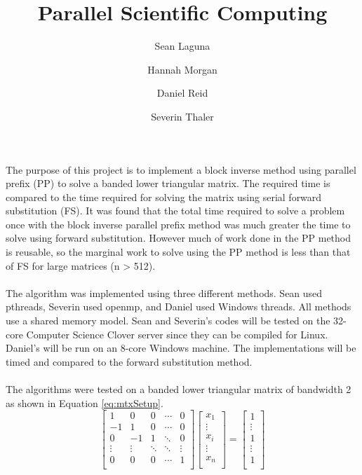 \documentclass[a4paper,12pt]{article}
\title{Parallel Scientific Computing}
\author{Sean Laguna  \\
	\and 
	Hannah Morgan \\
	\and
	Daniel Reid \\
	\and
	Severin Thaler \\
	}
\date{\vspace{-5ex}}
\begin{document}
\maketitle



\paragraph*{}
	The purpose of this project is to implement a block inverse method using parallel prefix (PP) to solve a banded lower triangular matrix.  The required time is compared to the time required for solving the matrix using serial forward substitution (FS).  It was found that the total time required to solve a problem once with the block inverse parallel prefix  method was much greater the time to solve using forward substitution.  However much of work done in the PP method is reusable, so the marginal work to solve using the PP method is less than that of FS for large matrices (n > 512).
\paragraph*{}
	The algorithm was implemented using three different methods.  Sean used pthreads, Severin used openmp, and Daniel used Windows threads.  All methods use a shared memory model.  Sean and Severin's codes will be tested on the 32-core Computer Science Clover server since they can be compiled for Linux.  Daniel's will be run on an 8-core Windows machine.  The implementations will be timed and compared to the forward substitution method.

\paragraph*{}
	The algorithms were tested on a banded lower triangular matrix of bandwidth 2 as shown in Equation \ref{eq:mtxSetup}.
	\begin{equation} \label{eq:mtxSetup}
		\begin{bmatrix}
		1 & 0 & 0  &  \cdots & 0  \\
		-1  & 1  & 0&   \cdots & 0 \\
		0 & -1 & 1  & \ddots & 0 \\
		\vdots & \vdots & \ddots  & \ddots & \vdots\\
		 0 & 0 & 0 & \cdots &  1  \\
		\end{bmatrix}
		\begin{bmatrix}
		x_1\\
		\vdots \\
		x_i\\
		\vdots \\
		x_n\\
		\end{bmatrix} = 
		\begin{bmatrix}
		1\\
		\vdots \\
		1\\
		\vdots \\
		1\\
		\end{bmatrix}
	\end{equation}
	  
\end{document}
